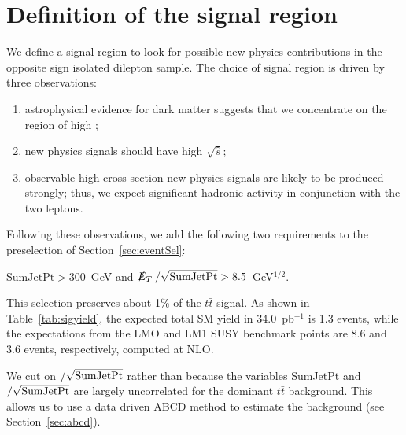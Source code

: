 \section{Definition of the signal region}
\label{sec:sigregion}

We define a signal region to look for possible
new physics contributions in the opposite sign isolated 
dilepton sample. The choice of signal region is driven by 
three observations:
\begin{enumerate}
\item astrophysical evidence for dark matter suggests that
we concentrate on the region of high \met;
\item new physics signals should have high $\sqrt{\hat{s}}$;
\item observable high cross section new physics signals 
are likely to be produced strongly;  thus, we expect significant
hadronic activity in conjunction with the two leptons.
\end{enumerate}

Following these observations, we add the following two requirements
to the preselection of Section~\ref{sec:eventSel}:
\begin{center}
$\mathrm{SumJetPt}>300$~GeV and $\met/\sqrt{\rm SumJetPt} > 8.5$~GeV$^{1/2}$.
\end{center}

\noindent This selection preserves about 1\% of the $t\bar{t}$ 
signal. As shown in Table~\ref{tab:sigyield}, the expected total SM yield in 34.0~pb$^{-1}$ is 1.3 events,
while the expectations from the LMO and LM1 SUSY benchmark points are 8.6 and
3.6 events, respectively, computed at NLO.  


We cut on \met$/\sqrt{\rm SumJetPt}$ rather than \met
because the variables SumJetPt and \met$/\sqrt{\rm SumJetPt}$ are
largely uncorrelated for the dominant $t\bar{t}$ background.  
This allows us to use a data driven ABCD method to estimate the
background (see Section~\ref{sec:abcd}). 




